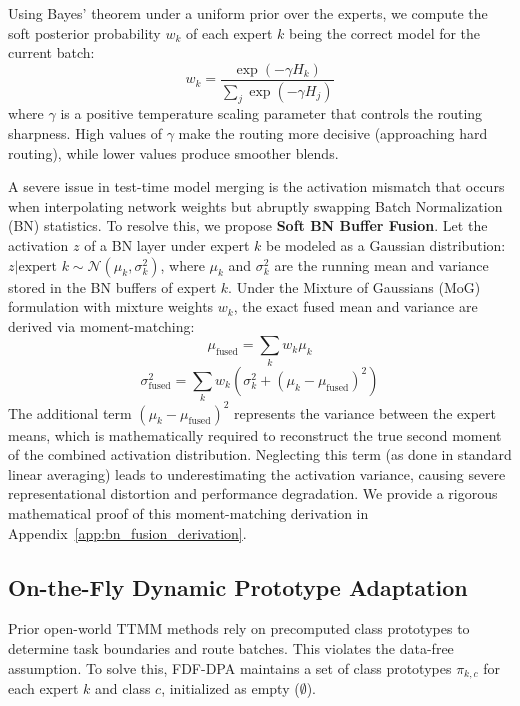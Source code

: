 \documentclass{article}
\theoremstyle{plain}
\theoremstyle{definition}
\theoremstyle{remark}
\begin{document}
Using Bayes' theorem under a uniform prior over the experts, we compute the soft posterior probability $w_k$ of each expert $k$ being the correct model for the current batch:
\begin{equation}
w_k = \frac{\exp(-\gamma H_k)}{\sum_j \exp(-\gamma H_j)}
\end{equation}
where $\gamma$ is a positive temperature scaling parameter that controls the routing sharpness. High values of $\gamma$ make the routing more decisive (approaching hard routing), while lower values produce smoother blends.

A severe issue in test-time model merging is the activation mismatch that occurs when interpolating network weights but abruptly swapping Batch Normalization (BN) statistics. To resolve this, we propose \textbf{Soft BN Buffer Fusion}. Let the activation $z$ of a BN layer under expert $k$ be modeled as a Gaussian distribution: $z | \text{expert } k \sim \mathcal{N}(\mu_k, \sigma_k^2)$, where $\mu_k$ and $\sigma_k^2$ are the running mean and variance stored in the BN buffers of expert $k$. Under the Mixture of Gaussians (MoG) formulation with mixture weights $w_k$, the exact fused mean and variance are derived via moment-matching:
\begin{equation}
\mu_{\text{fused}} = \sum_k w_k \mu_k
\end{equation}
\begin{equation}
\sigma_{\text{fused}}^2 = \sum_k w_k \left( \sigma_k^2 + (\mu_k - \mu_{\text{fused}})^2 \right)
\end{equation}
The additional term $(\mu_k - \mu_{\text{fused}})^2$ represents the variance between the expert means, which is mathematically required to reconstruct the true second moment of the combined activation distribution. Neglecting this term (as done in standard linear averaging) leads to underestimating the activation variance, causing severe representational distortion and performance degradation. We provide a rigorous mathematical proof of this moment-matching derivation in Appendix~\ref{app:bn_fusion_derivation}.

\subsection{On-the-Fly Dynamic Prototype Adaptation}
Prior open-world TTMM methods rely on precomputed class prototypes to determine task boundaries and route batches. This violates the data-free assumption. To solve this, FDF-DPA maintains a set of class prototypes $\pi_{k,c}$ for each expert $k$ and class $c$, initialized as empty ($\emptyset$).
\end{document}
